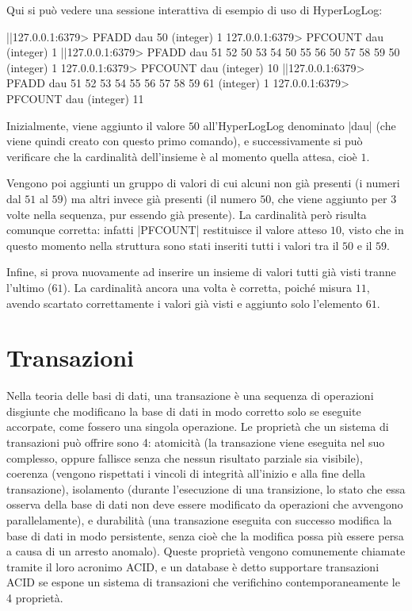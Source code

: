 Qui si può vedere una sessione interattiva di esempio di uso di HyperLogLog:

\begin{commentedsource}[style=redis]
|\lnote|127.0.0.1:6379> PFADD dau 50
(integer) 1
127.0.0.1:6379> PFCOUNT dau
(integer) 1
|\lnote|127.0.0.1:6379> PFADD dau 51 52 50 53 54 50 55 56 50 57 58 59 50
(integer) 1
127.0.0.1:6379> PFCOUNT dau
(integer) 10
|\lnote|127.0.0.1:6379> PFADD dau 51 52 53 54 55 56 57 58 59 61
(integer) 1
127.0.0.1:6379> PFCOUNT dau
(integer) 11
\end{commentedsource}

Inizialmente, viene aggiunto il valore $50$ all'HyperLogLog denominato \cverb|dau|  (che
viene quindi creato con questo primo comando), e successivamente si può verificare che la
cardinalità dell'insieme è al momento quella attesa, cioè $1$.

Vengono poi aggiunti un gruppo di valori  di cui alcuni non già presenti (i numeri dal $51$
al $59$) ma altri invece già presenti (il numero $50$, che viene aggiunto per 3 volte nella
sequenza, pur essendo già presente). La cardinalità però risulta comunque corretta: infatti
\cverb|PFCOUNT| restituisce il valore atteso $10$, visto che in questo momento nella struttura sono
stati inseriti tutti i valori tra il $50$ e il $59$. 

Infine, si prova nuovamente ad inserire un insieme di valori  tutti già visti tranne
l'ultimo ($61$). La cardinalità ancora una volta è corretta, poiché misura $11$, avendo scartato
correttamente i valori già visti e aggiunto solo l'elemento $61$.

\section{Transazioni}

Nella teoria delle basi di dati, una transazione è una sequenza di operazioni disgiunte che
modificano la base di dati in modo corretto solo se eseguite accorpate, come fossero una singola
operazione. Le proprietà che un sistema di transazioni può offrire sono 4: atomicità (la transazione
viene eseguita nel suo complesso, oppure fallisce senza che nessun risultato parziale sia visibile),
coerenza (vengono rispettati i vincoli di integrità all'inizio e alla fine della transazione),
isolamento (durante l'esecuzione di una transizione, lo stato che essa osserva della base di dati
non deve essere modificato da operazioni che avvengono parallelamente), e durabilità (una
transazione eseguita con successo modifica la base di dati in modo persistente, senza cioè che la
modifica possa più essere persa a causa di un arresto anomalo). Queste proprietà vengono comunemente
chiamate tramite il loro acronimo ACID, e un database è detto supportare transazioni ACID se espone
un sistema di transazioni che verifichino contemporaneamente le 4 proprietà.

